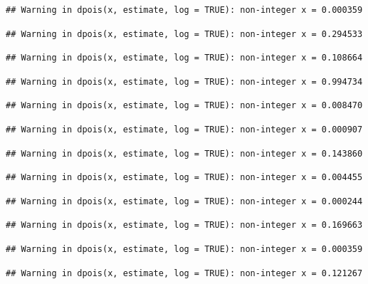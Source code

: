 \documentclass[]{article}
\begin{document}
\begin{verbatim}
## Warning in dpois(x, estimate, log = TRUE): non-integer x = 0.000359
\end{verbatim}

\begin{verbatim}
## Warning in dpois(x, estimate, log = TRUE): non-integer x = 0.294533
\end{verbatim}

\begin{verbatim}
## Warning in dpois(x, estimate, log = TRUE): non-integer x = 0.108664
\end{verbatim}

\begin{verbatim}
## Warning in dpois(x, estimate, log = TRUE): non-integer x = 0.994734
\end{verbatim}

\begin{verbatim}
## Warning in dpois(x, estimate, log = TRUE): non-integer x = 0.008470
\end{verbatim}

\begin{verbatim}
## Warning in dpois(x, estimate, log = TRUE): non-integer x = 0.000907
\end{verbatim}

\begin{verbatim}
## Warning in dpois(x, estimate, log = TRUE): non-integer x = 0.143860
\end{verbatim}

\begin{verbatim}
## Warning in dpois(x, estimate, log = TRUE): non-integer x = 0.004455
\end{verbatim}

\begin{verbatim}
## Warning in dpois(x, estimate, log = TRUE): non-integer x = 0.000244
\end{verbatim}

\begin{verbatim}
## Warning in dpois(x, estimate, log = TRUE): non-integer x = 0.169663
\end{verbatim}

\begin{verbatim}
## Warning in dpois(x, estimate, log = TRUE): non-integer x = 0.000359
\end{verbatim}

\begin{verbatim}
## Warning in dpois(x, estimate, log = TRUE): non-integer x = 0.121267
\end{verbatim}
\end{document}
